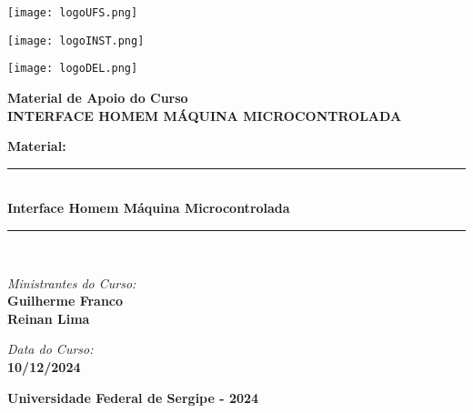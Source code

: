 \documentclass[a4paper,12pt]{report}
\begin{document}
\begin{titlepage}
\begin{center}


\begin{minipage}{2cm}
    \centering
    \texttt{[image: logoUFS.png]}
\end{minipage}
\hfill
\begin{minipage}{11cm}
    \centering
    \texttt{[image: logoINST.png]}
\end{minipage}
\hfill
\begin{minipage}{3cm}
    \centering
    \texttt{[image: logoDEL.png]}
\end{minipage}



\vspace{2cm}

{\large \bfseries Material de Apoio do Curso}\\[0.5cm]
{\huge \bfseries INTERFACE HOMEM MÁQUINA MICROCONTROLADA} \\[0.5cm]

\vspace{2.5cm}

{\large \bfseries Material:}\\[0.5cm]
\rule{\linewidth}{0.3mm} \\[0.6cm]
{\huge \bfseries \color{blue} Interface Homem Máquina Microcontrolada} \\[0.2cm]
\rule{\linewidth}{0.3mm} \\[2cm]

\noindent
\begin{minipage}{0.4\textwidth}
    \begin{flushleft} \large
        \emph{Ministrantes do Curso:}\\
        \textbf{Guilherme Franco} \\
        \textbf{Reinan Lima}
    \end{flushleft}
\end{minipage}%
\begin{minipage}{0.6\textwidth}
    \begin{flushright} \large
        \emph{Data do Curso:}\\
        \textbf{10/12/2024}
    \end{flushright}
\end{minipage}

\vfill

{\textbf{\large Universidade Federal de Sergipe - 2024}}

\end{center}
\end{titlepage}
\end{document}
